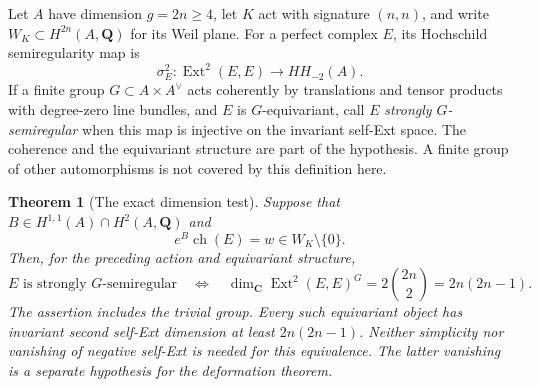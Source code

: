 \documentclass[11pt]{article}
\newtheorem{theorem}{Theorem}[section]
\theoremstyle{definition}
\theoremstyle{remark}
\newcommand{\Q}{\mathbf Q}
\newcommand{\C}{\mathbf C}
\begin{document}
Let $A$ have dimension $g=2n\ge4$, let $K$ act with signature $(n,n)$, and write $W_K\subset H^{2n}(A,\Q)$ for its Weil plane. For a perfect complex $E$, its Hochschild semiregularity map is
\[
 \sigma_E^2:\operatorname{Ext}^2(E,E)\longrightarrow HH_{-2}(A).
\]
If a finite group $G\subset A\times A^\vee$ acts coherently by translations and tensor products with degree-zero line bundles, and $E$ is $G$-equivariant, call $E$ \emph{strongly $G$-semiregular} when this map is injective on the invariant self-Ext space. The coherence and the equivariant structure are part of the hypothesis. A finite group of other automorphisms is not covered by this definition here.

\begin{theorem}[The exact dimension test]\label{thm:pure-weil-ext}
Suppose that $B\in H^{1,1}(A)\cap H^2(A,\Q)$ and
\[
 e^B\operatorname{ch}(E)=w\in W_K\setminus\{0\}.
\]
Then, for the preceding action and equivariant structure,
\[
 E\text{ is strongly }G\text{-semiregular}
 \quad\Longleftrightarrow\quad
 \dim_{\C}\operatorname{Ext}^2(E,E)^G
     =2\binom{2n}{2}=2n(2n-1).
\]
The assertion includes the trivial group. Every such equivariant object has invariant second self-Ext dimension at least $2n(2n-1)$. Neither simplicity nor vanishing of negative self-Ext is needed for this equivalence. The latter vanishing is a separate hypothesis for the deformation theorem.
\end{theorem}
\end{document}
